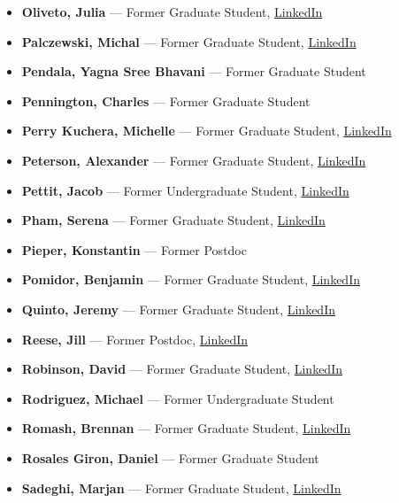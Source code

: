 \documentclass[12pt,a4paper]{article}
\begin{document}
\begin{itemize}
    \item \textbf{Oliveto, Julia} --- Former Graduate Student, \href{https://www.linkedin.com/in/julia-oliveto-3a1197171/}{LinkedIn}
    \item \textbf{Palczewski, Michal} --- Former Graduate Student, \href{https://www.linkedin.com/in/michal-palczewski-208b868/}{LinkedIn}
    \item \textbf{Pendala, Yagna Sree Bhavani} --- Former Graduate Student
    \item \textbf{Pennington, Charles} --- Former Graduate Student
    \item \textbf{Perry Kuchera, Michelle} --- Former Graduate Student, \href{https://www.linkedin.com/in/michelle-perry-kuchera-56b9087/}{LinkedIn}
    \item \textbf{Peterson, Alexander} --- Former Graduate Student, \href{https://www.linkedin.com/in/alexander-peterson-a6331917b/}{LinkedIn}
    \item \textbf{Pettit, Jacob} --- Former Undergraduate Student, \href{https://www.linkedin.com/in/jacob-pettit-9524b8178/}{LinkedIn}
    \item \textbf{Pham, Serena} --- Former Graduate Student, \href{https://www.linkedin.com/in/serena-pham-33b66667/}{LinkedIn}
    \item \textbf{Pieper, Konstantin} --- Former Postdoc
    \item \textbf{Pomidor, Benjamin} --- Former Graduate Student, \href{https://www.linkedin.com/in/benjamin-pomidor-789a7442/}{LinkedIn}
    \item \textbf{Quinto, Jeremy} --- Former Graduate Student, \href{https://www.linkedin.com/in/jeremy-quinto-6110a5142/}{LinkedIn}
    \item \textbf{Reese, Jill} --- Former Postdoc, \href{https://www.linkedin.com/in/jill-reese-2516484/}{LinkedIn}
    \item \textbf{Robinson, David} --- Former Graduate Student, \href{https://www.linkedin.com/in/david-robinson-8a6239120/}{LinkedIn}
    \item \textbf{Rodriguez, Michael} --- Former Undergraduate Student
    \item \textbf{Romash, Brennan} --- Former Graduate Student, \href{https://www.linkedin.com/in/brennan-romash-9a6422b4/}{LinkedIn}
    \item \textbf{Rosales Giron, Daniel} --- Former Graduate Student
    \item \textbf{Sadeghi, Marjan} --- Former Graduate Student, \href{https://www.linkedin.com/in/marjansadeghi/}{LinkedIn}

\end{itemize}
\end{document}
